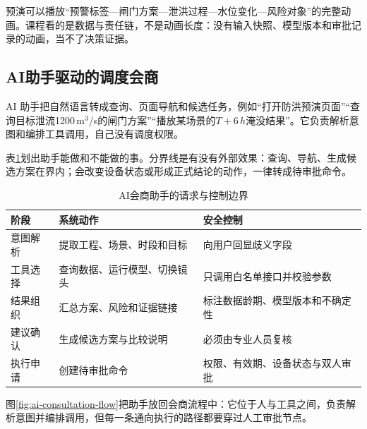 预演可以播放“预警标签—闸门方案—泄洪过程—水位变化—风险对象”的完整动画。课程看的是数据与责任链，不是动画长度：没有输入快照、模型版本和审批记录的动画，当不了决策证据。

\subsection{AI助手驱动的调度会商}

AI 助手把自然语言转成查询、页面导航和候选任务，例如“打开防洪预演页面”“查询目标泄流1200\,m$^3$/s的闸门方案”“播放某场景的$T+6\,h$淹没结果”。它负责解析意图和编排工具调用，自己没有调度权限。

表\ref{tab:ai-assistant-boundary}划出助手能做和不能做的事。分界线是有没有外部效果：查询、导航、生成候选方案在界内；会改变设备状态或形成正式结论的动作，一律转成待审批命令。

\begin{table}[htbp]
\centering
\caption{AI会商助手的请求与控制边界}
\label{tab:ai-assistant-boundary}
\begin{tabular}{p{2.5cm}p{4.5cm}p{5.5cm}}
\toprule
阶段 & 系统动作 & 安全控制 \\
\midrule
意图解析 & 提取工程、场景、时段和目标 & 向用户回显歧义字段 \\
工具选择 & 查询数据、运行模型、切换镜头 & 只调用白名单接口并校验参数 \\
结果组织 & 汇总方案、风险和证据链接 & 标注数据龄期、模型版本和不确定性 \\
建议确认 & 生成候选方案与比较说明 & 必须由专业人员复核 \\
执行申请 & 创建待审批命令 & 权限、有效期、设备状态与双人审批 \\
\bottomrule
\end{tabular}
\end{table}

图\ref{fig:ai-consultation-flow}把助手放回会商流程中：它位于人与工具之间，负责解析意图并编排调用，但每一条通向执行的路径都要穿过人工审批节点。

